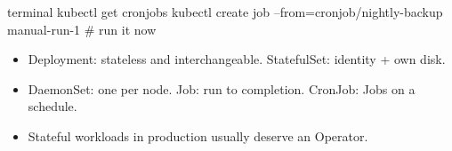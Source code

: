 \begin{bashcode}{terminal}
kubectl get cronjobs
kubectl create job --from=cronjob/nightly-backup manual-run-1   # run it now
\end{bashcode}

\begin{recap}
\begin{itemize}
  \item Deployment: stateless and interchangeable. StatefulSet: identity + own disk.
  \item DaemonSet: one per node. Job: run to completion. CronJob: Jobs on a schedule.
  \item Stateful workloads in production usually deserve an Operator.
\end{itemize}
\end{recap}
